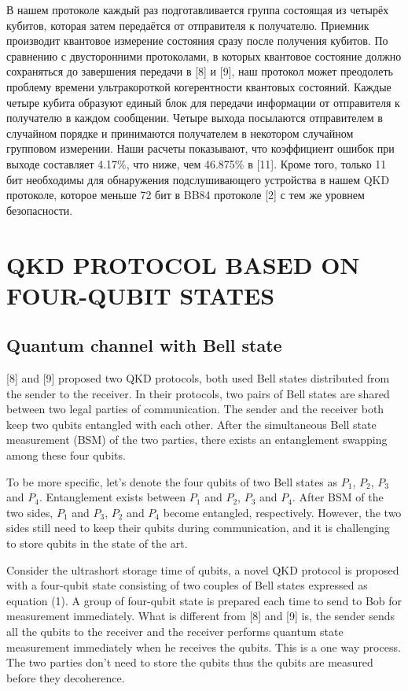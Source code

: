 \documentclass[a4paper,11pt]{article}
\begin{document}
В нашем протоколе каждый раз подготавливается группа состоящая из четырёх кубитов, которая затем передаётся от отправителя к получателю. Приемник производит квантовое измерение состояния сразу после получения кубитов. По сравнению с двусторонними протоколами, в которых квантовое состояние должно сохраняться до завершения передачи в [8] и [9], наш протокол может преодолеть проблему времени ультракороткой когерентности квантовых состояний. Каждые четыре кубита образуют единый блок для передачи информации от отправителя к получателю в каждом сообщении. Четыре выхода посылаются отправителем в случайном порядке и принимаются получателем в некотором случайном групповом измерении. Наши расчеты показывают, что коэффициент ошибок при выходе составляет 4.17\%, что ниже, чем 46.875\% в [11]. Кроме того, только 11 бит необходимы для обнаружения подслушивающего устройства в нашем QKD протоколе, которое меньше 72 бит в BB84 протоколе [2] с тем же уровнем безопасности.
\section{QKD PROTOCOL BASED ON FOUR-QUBIT STATES}

\subsection{Quantum channel with Bell state}

[8] and [9] proposed two QKD protocols, both used Bell states distributed from the sender to the receiver. In their protocols, two pairs of Bell states are shared between two legal parties of communication. The sender and the receiver both keep two qubits entangled with each other. After the simultaneous Bell state measurement (BSM) of the two parties, there exists an entanglement swapping among these four qubits.

To be more specific, let’s denote the four qubits of two Bell states as $P_1$, $P_2$, $P_3$ and $P_4$. Entanglement exists between $P_1$ and $P_2$, $P_3$ and $P_4$. After BSM of the two sides, $P_1$ and $P_3$, $P_2$ and $P_4$ become entangled, respectively. However, the two sides still need to keep their qubits during communication, and it is challenging to store qubits in the state of the art.

Consider the ultrashort storage time of qubits, a novel QKD protocol is proposed with a four-qubit state consisting of two couples of Bell states expressed as equation (1). A group of four-qubit state is prepared each time to send to Bob for measurement immediately. What is different from [8] and [9]
is, the sender sends all the qubits to the receiver and the receiver performs quantum state measurement immediately when he receives the qubits. This is a one way process. The two parties don’t need to store the qubits thus the qubits are measured before they decoherence.
\end{document}
